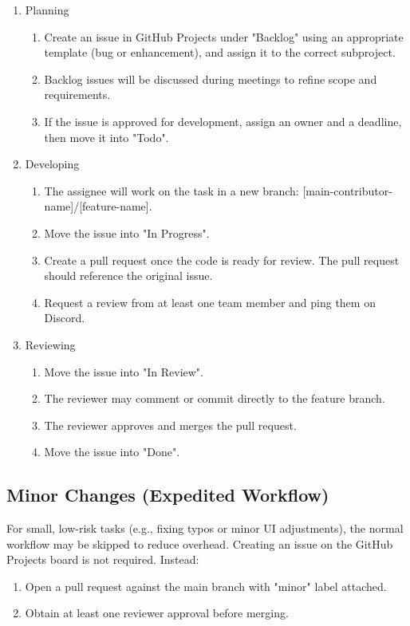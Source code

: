 \documentclass{article}
\begin{document}
\begin{enumerate}
  \item Planning
        \begin{enumerate}
          \item Create an issue in GitHub Projects under "Backlog" using an appropriate
                template (bug or enhancement), and assign it to the correct subproject.
          \item Backlog issues will be discussed during meetings to refine scope and
                requirements.
          \item If the issue is approved for development, assign an owner and a deadline, then
                move it into "Todo".
        \end{enumerate}
  \item Developing
        \begin{enumerate}
          \item The assignee will work on the task in a new branch:
                [main-contributor-name]/[feature-name].
          \item Move the issue into "In Progress".
          \item Create a pull request once the code is ready for review. The pull request
                should reference the original issue.
          \item Request a review from at least one team member and ping them on Discord.
        \end{enumerate}
  \item Reviewing
        \begin{enumerate}
          \item Move the issue into "In Review".
          \item The reviewer may comment or commit directly to the feature branch.
          \item The reviewer approves and merges the pull request.
          \item Move the issue into "Done".
        \end{enumerate}
\end{enumerate}

\subsection{Minor Changes (Expedited Workflow)}

For small, low-risk tasks (e.g., fixing typos or minor UI adjustments), the
normal workflow may be skipped to reduce overhead. Creating an issue on the
GitHub Projects board is not required. Instead:
\begin{enumerate}
  \item Open a pull request against the main branch with "minor" label attached.
  \item Obtain at least one reviewer approval before merging.
\end{enumerate}
\end{document}
